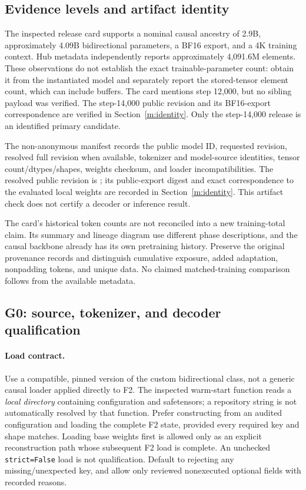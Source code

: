 \documentclass{article}
\theoremstyle{remark}\newtheorem{remark}[theorem]{Remark}
\begin{document}
\subsection{Evidence levels and artifact identity}
The inspected release card supports a nominal causal ancestry of 2.9B, approximately 4.09B bidirectional parameters, a BF16 export, and a 4K training context. Hub metadata independently reports approximately 4,091.6M elements. These observations do not establish the exact trainable-parameter count: obtain it from the instantiated model and separately report the stored-tensor element count, which can include buffers. The card mentions step 12,000, but no sibling payload was verified. The step-14,000 public revision and its BF16-export correspondence are verified in Section~\ref{m:identity}. Only the step-14,000 release is an identified primary candidate.

The non-anonymous manifest records the public model ID, requested revision, resolved full revision when available, tokenizer and model-source identities, tensor count/dtypes/shapes, weights checksum, and loader incompatibilities. The resolved public revision is ; its public-export digest and exact correspondence to the evaluated local weights are recorded in Section~\ref{m:identity}. This artifact check does not certify a decoder or inference result.

The card's historical token counts are not reconciled into a new training-total claim. Its summary and lineage diagram use different phase descriptions, and the causal backbone already has its own pretraining history. Preserve the original provenance records and distinguish cumulative exposure, added adaptation, nonpadding tokens, and unique data. No claimed matched-training comparison follows from the available metadata.

\subsection{G0: source, tokenizer, and decoder qualification}
\paragraph{Load contract.}
Use a compatible, pinned version of the custom bidirectional class, not a generic causal loader applied directly to F2. The inspected warm-start function reads a \emph{local directory} containing configuration and safetensors; a repository string is not automatically resolved by that function. Prefer constructing from an audited configuration and loading the complete F2 state, provided every required key and shape matches. Loading base weights first is allowed only as an explicit reconstruction path whose subsequent F2 load is complete. An unchecked \texttt{strict=False} load is not qualification. Default to rejecting any missing/unexpected key, and allow only reviewed nonexecuted optional fields with recorded reasons.
\end{document}
